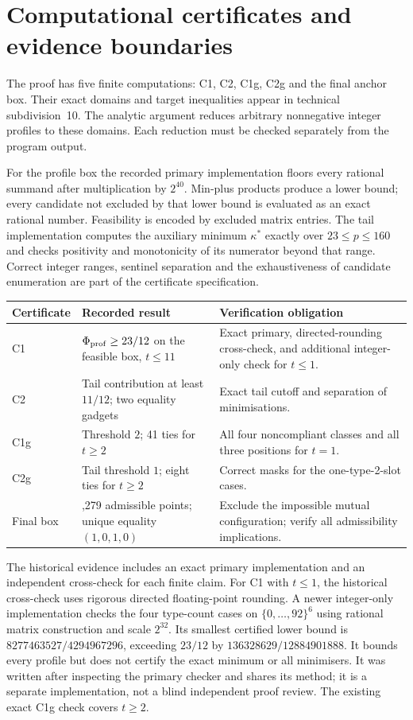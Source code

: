 \section{Computational certificates and evidence boundaries}
The proof has five finite computations: C1, C2, C1g, C2g and the final anchor box. Their exact domains and target inequalities appear in technical subdivision~10. The analytic argument reduces arbitrary nonnegative integer profiles to these domains. Each reduction must be checked separately from the program output.

For the profile box the recorded primary implementation floors every rational summand after multiplication by $2^{40}$. Min-plus products produce a lower bound; every candidate not excluded by that lower bound is evaluated as an exact rational number. Feasibility is encoded by excluded matrix entries. The tail implementation computes the auxiliary minimum $\kappa^*$ exactly over $23\leq p\leq160$ and checks positivity and monotonicity of its numerator beyond that range. Correct integer ranges, sentinel separation and the exhaustiveness of candidate enumeration are part of the certificate specification.

\begin{center}
\begin{tabular}{>{\raggedright\arraybackslash}p{.16\linewidth}>{\raggedright\arraybackslash}p{.38\linewidth}>{\raggedright\arraybackslash}p{.34\linewidth}}
\toprule
Certificate & Recorded result & Verification obligation\\\midrule
C1 & $\Phi_{\rm prof}\geq23/12$ on the feasible box, $t\leq11$ & Exact primary, directed-rounding cross-check, and additional integer-only check for $t\leq1$.\\
C2 & Tail contribution at least $11/12$; two equality gadgets & Exact tail cutoff and separation of minimisations.\\
C1g & Threshold $2$; 41 ties for $t\geq2$ & All four noncompliant classes and all three positions for $t=1$.\\
C2g & Tail threshold $1$; eight ties for $t\geq2$ & Correct masks for the one-type-2-slot cases.\\
Final box & 3,279 admissible points; unique equality $(1,0,1,0)$ & Exclude the impossible mutual configuration; verify all admissibility implications.\\\bottomrule
\end{tabular}
\end{center}
The historical evidence includes an exact primary implementation and an independent cross-check for each finite claim. For C1 with $t\leq1$, the historical cross-check uses rigorous directed floating-point rounding. A newer integer-only implementation checks the four type-count cases on $\{0,\ldots,92\}^6$ using rational matrix construction and scale $2^{32}$. Its smallest certified lower bound is $8277463527/4294967296$, exceeding $23/12$ by $136328629/12884901888$. It bounds every profile but does not certify the exact minimum or all minimisers. It was written after inspecting the primary checker and shares its method; it is a separate implementation, not a blind independent proof review. The existing exact C1g check covers $t\geq2$.

